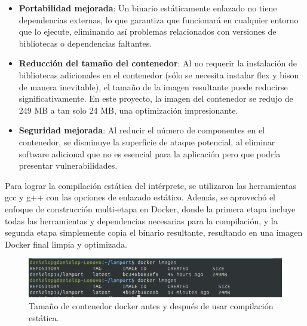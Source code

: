 \begin{itemize}
\item \textbf{Portabilidad mejorada}: Un binario estáticamente enlazado no tiene dependencias externas, lo que garantiza que funcionará en cualquier entorno que lo ejecute, eliminando así problemas relacionados con versiones de bibliotecas o dependencias faltantes.
\item \textbf{Reducción del tamaño del contenedor}: Al no requerir la instalación de bibliotecas adicionales en el contenedor (sólo se necesita instalar flex y bison de manera inevitable), el tamaño de la imagen resultante puede reducirse significativamente. En este proyecto, la imagen del contenedor se redujo de 249 MB a tan solo 24 MB, una optimización impresionante.
\item \textbf{Seguridad mejorada}: Al reducir el número de componentes en el contenedor, se disminuye la superficie de ataque potencial, al eliminar software adicional que no es esencial para la aplicación pero que podría presentar vulnerabilidades.
\end{itemize}

Para lograr la compilación estática del intérprete, se utilizaron las herramientas gcc y g++ con las opciones de enlazado estático. Además, se aprovechó el enfoque de construcción multi-etapa en Docker, donde la primera etapa incluye todas las herramientas y dependencias necesarias para la compilación, y la segunda etapa simplemente copia el binario resultante, resultando en una imagen Docker final limpia y optimizada.

\begin{figure}[h]
    \begin{adjustbox}{center}
        \includegraphics[width=7.0in]{images/implementacion/docker/docker_reduce.png}
    \end{adjustbox}
    \caption{Tamaño de contenedor docker antes y después de usar compilación estática.}
    \label{fig:DockerReduce}
\end{figure}